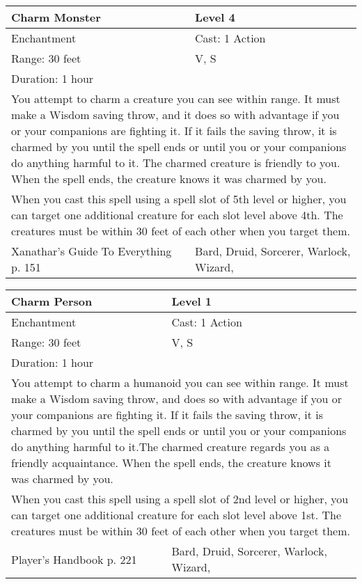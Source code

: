 \documentclass[11pt]{report}
\begin{document}
\begin{table}[H]
	\begin{tabular}{||p{6cm}|p{6cm}||}
		\hline\hline
		\bf{Charm Monster} & Level 4\\ \hline
		Enchantment & Cast: 1 Action\\ \hline
		Range: 30 feet & V, S\\ \hline
		Duration: 1 hour & \\ \hline
		\multicolumn{2}{||p{12cm}||}{You attempt to charm a creature you can see within range. It must make a Wisdom saving throw, and it does so with advantage if you or your companions are fighting it. If it fails the saving throw, it is charmed by you until the spell ends or until you or your companions do anything harmful to it. The charmed creature is friendly to you. When the spell ends, the creature knows it was charmed by you.}\\ \hline
		\multicolumn{2}{||p{12cm}||}{When you cast this spell using a spell slot of 5th level or higher, you can target one additional creature for each slot level above 4th. The creatures must be within 30 feet of each other when you target them.}\\ \hline
Xanathar's Guide To Everything p. 151 & Bard, Druid, Sorcerer, Warlock, Wizard, \\ \hline\hline
	\end{tabular}
\end{table}

\begin{table}[H]
	\begin{tabular}{||p{6cm}|p{6cm}||}
		\hline\hline
		\bf{Charm Person} & Level 1\\ \hline
		Enchantment & Cast: 1 Action\\ \hline
		Range: 30 feet & V, S\\ \hline
		Duration: 1 hour & \\ \hline
		\multicolumn{2}{||p{12cm}||}{You attempt to charm a humanoid you can see within range. 
It must make a Wisdom saving throw, and does so with advantage if you or your companions are fighting it. If it fails the saving throw, it is charmed by you until the spell ends or until you  or your companions do anything harmful to it.The charmed creature regards you as a friendly acquaintance. When the spell ends, the creature knows it was charmed by you.}\\ \hline
		\multicolumn{2}{||p{12cm}||}{When you cast this spell using a spell slot of 2nd level or higher, you can target one additional creature for each slot level above 1st. The creatures must be within 30 feet of each other when you target them.}\\ \hline
Player's Handbook p. 221 & Bard, Druid, Sorcerer, Warlock, Wizard, \\ \hline\hline
	\end{tabular}
\end{table}
\end{document}
